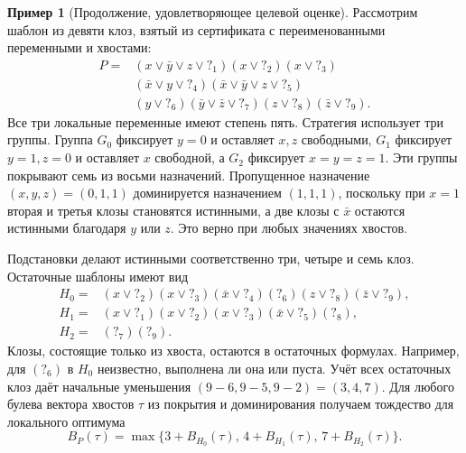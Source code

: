 \documentclass[10pt,twoside]{article}
\newcommand{\tail}[1]{\mathord{?}_{#1}}
\theoremstyle{definition}
\newtheorem{example}{Пример}
\theoremstyle{remark}
\begin{document}
\begin{example}[Продолжение, удовлетворяющее целевой оценке]
\label{ex:group}
Рассмотрим шаблон из девяти клоз, взятый из сертификата с
переименованными переменными и хвостами:
\begin{equation}
\begin{split}
 P={}&(x\vee\bar y\vee z\vee\tail{1})(x\vee\tail{2})
       (x\vee\tail{3})\\
    & (\bar x\vee y\vee\tail{4})(\bar x\vee\bar y\vee z\vee\tail{5})\\
    & (y\vee\tail{6})(\bar y\vee\bar z\vee\tail{7})
       (z\vee\tail{8})(\bar z\vee\tail{9}).
\end{split}
\label{eq:example-parent}
\end{equation}
Все три локальные переменные имеют степень пять. Стратегия использует
три группы. Группа $G_0$ фиксирует $y=0$ и оставляет $x,z$ свободными,
$G_1$ фиксирует $y=1,z=0$ и оставляет $x$ свободной, а $G_2$ фиксирует
$x=y=z=1$. Эти группы покрывают семь из восьми назначений. Пропущенное
назначение $(x,y,z)=(0,1,1)$ доминируется назначением $(1,1,1)$, поскольку
при $x=1$ вторая и третья клозы становятся истинными, а две клозы с
$\bar x$ остаются истинными благодаря $y$ или $z$. Это верно при любых
значениях хвостов.

Подстановки делают истинными соответственно три, четыре и семь клоз.
Остаточные шаблоны имеют вид
\begin{align*}
 H_0={}&(x\vee\tail{2})(x\vee\tail{3})(\bar x\vee\tail{4})
         (\tail{6})(z\vee\tail{8})(\bar z\vee\tail{9}),\\
 H_1={}&(x\vee\tail{1})(x\vee\tail{2})(x\vee\tail{3})
         (\bar x\vee\tail{5})(\tail{8}),\\
 H_2={}&(\tail{7})(\tail{9}).
\end{align*}
Клозы, состоящие только из хвоста, остаются в остаточных формулах.
Например, для $(\tail{6})$ в $H_0$ неизвестно, выполнена ли она или
пуста. Учёт всех остаточных клоз даёт начальные уменьшения
$(9-6,9-5,9-2)=(3,4,7)$. Для любого булева вектора хвостов $\tau$ из
покрытия и доминирования получаем тождество для локального оптимума
\begin{equation}
 B_P(\tau)=\max\{3+B_{H_0}(\tau),\,4+B_{H_1}(\tau),\,7+B_{H_2}(\tau)\}.
 \label{eq:example-identity}
\end{equation}


\end{example}
\end{document}
